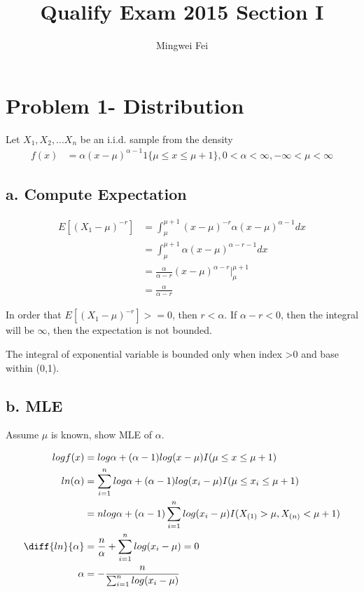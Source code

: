 \documentclass[11pt]{article} %
\title{Qualify Exam 2015 Section I}
\author{Mingwei Fei}
\begin{document}
	
	\maketitle
	
\section{Problem 1- Distribution}
	Let $X_1, X_2,... X_n$ be an i.i.d. sample from the density
	\begin{align*}
		f(x) &= \alpha(x-\mu)^{\alpha-1} 1\{ \mu \leq x \leq \mu+1\}, 0< \alpha < \infty, -\infty < \mu < \infty
	\end{align*}	
	
\subsection{a. Compute Expectation}

	\begin{align*}
		E[(X_1- \mu)^{-r}] &= \int_{\mu}^{\mu+1} (x-\mu)^{-r} \alpha (x-\mu)^{\alpha-1} dx \\
		&= \int_{\mu}^{\mu+1} \alpha (x-\mu)^{\alpha-r-1} dx \\
		&= \frac{\alpha}{\alpha -r} (x-\mu)^{\alpha-r} \Bigg |_{\mu}^{\mu+1}\\
		&=  \frac{\alpha}{\alpha -r} 
	\end{align*}	

In order that $E[(X_1- \mu)^{-r}] >= 0$, then $r < \alpha$. If $\alpha -r < 0$, then the integral will be $
\infty$, then the expectation is not bounded.

The integral of exponential variable is bounded only when index >0 and base within (0,1).

\subsection{b. MLE}
Assume $\mu$ is known, show MLE of $\alpha$.

	\begin{align*}
		log f(x)&= log \alpha + (\alpha -1) log(x-\mu) I(\mu \leq x \leq \mu+1)\\
		ln(\alpha) &= \sum_{i=1}^n log \alpha + (\alpha -1) log(x_i-\mu) I(\mu \leq x_i \leq \mu+1) \\
		&= n log \alpha +  (\alpha -1) \sum_{i=1}^n log (x_i - \mu) I(X_{(1)} > \mu, X_{(n)} < \mu+1)\\
		\diff{ln}{\alpha}&= \frac{n}{\alpha } +\sum_{i=1}^n log (x_i - \mu) =0 \\
		\alpha &= - \frac{n}{\sum_{i=1}^n log (x_i - \mu)} 
	\end{align*}
	
\end{document}
